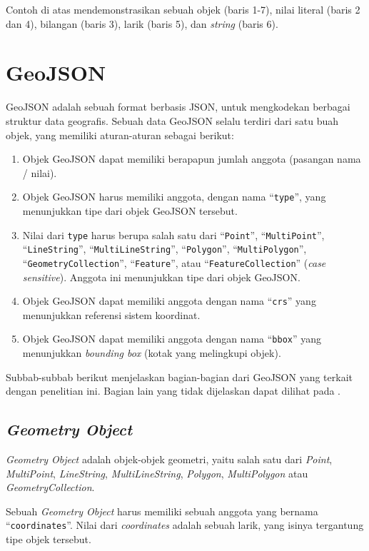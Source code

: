 Contoh di atas mendemonstrasikan sebuah objek (baris 1-7), nilai literal (baris 2 dan 4), bilangan (baris 3), larik (baris 5), dan \textit{string} (baris 6).

\section{GeoJSON}

GeoJSON adalah sebuah format berbasis JSON, untuk mengkodekan berbagai struktur data geografis\cite{geojson}. Sebuah data GeoJSON selalu terdiri dari satu buah objek, yang memiliki aturan-aturan sebagai berikut:

\begin{enumerate}
	\item Objek GeoJSON dapat memiliki berapapun jumlah anggota (pasangan nama / nilai).
	\item Objek GeoJSON harus memiliki anggota, dengan nama ``\texttt{type}'', yang menunjukkan tipe dari objek GeoJSON tersebut.
	\item Nilai dari \texttt{type} harus berupa salah satu dari ``\texttt{Point}'', ``\texttt{MultiPoint}'', ``\texttt{LineString}'', ``\texttt{MultiLineString}'', ``\texttt{Polygon}'', ``\texttt{MultiPolygon}'', ``\texttt{GeometryCollection}'', ``\texttt{Feature}'', atau ``\texttt{FeatureCollection}'' (\textit{case sensitive}). Anggota ini menunjukkan tipe dari objek GeoJSON.
	\item Objek GeoJSON dapat memiliki anggota dengan nama ``\texttt{crs}'' yang menunjukkan referensi sistem koordinat.
	\item Objek GeoJSON dapat memiliki anggota dengan nama ``\texttt{bbox}'' yang menunjukkan \textit{bounding box} (kotak yang melingkupi objek).
\end{enumerate}

Subbab-subbab berikut menjelaskan bagian-bagian dari GeoJSON yang terkait dengan penelitian ini. Bagian lain yang tidak dijelaskan dapat dilihat pada \cite{geojson}.

\subsection{\textit{Geometry Object}}

\textit{Geometry Object} adalah objek-objek geometri, yaitu salah satu dari \textit{Point}, \textit{MultiPoint}, \textit{LineString}, \textit{MultiLineString}, \textit{Polygon}, \textit{MultiPolygon} atau \textit{GeometryCollection}.

Sebuah \textit{Geometry Object} harus memiliki sebuah anggota yang bernama ``\texttt{coordinates}''. Nilai dari \textit{coordinates} adalah sebuah larik, yang isinya tergantung tipe objek tersebut.

